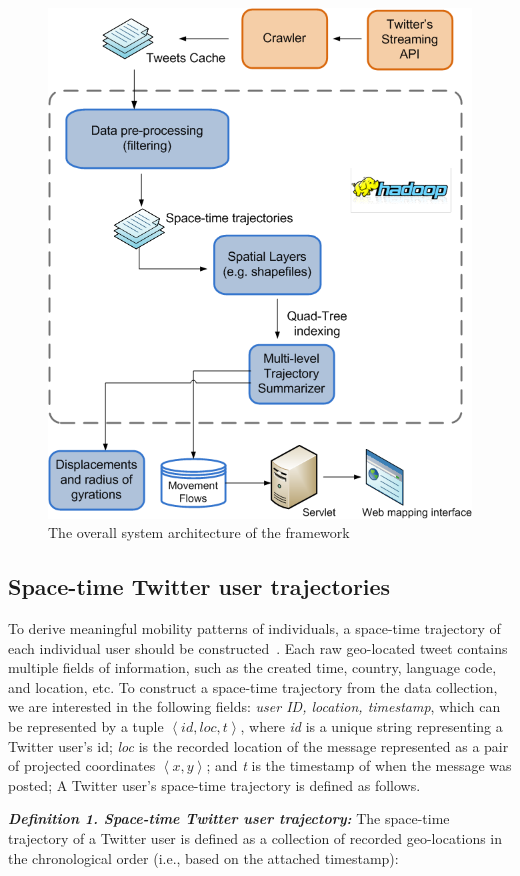 \documentclass[ijgi,article,accept,moreauthors,pdftex,10pt,a4paper]{mdpi}
\theoremstyle{mdpi}
\newcounter{ex}
\newcounter{re}
\theoremstyle{mdpidefinition}
\begin{document}
\begin{figure}[ht]
\centering
\includegraphics[width=0.55\linewidth]{./figures/Overall_Architecture222}
\caption{The overall system architecture of the framework}
\label{fig:overall_archi}
\end{figure}
\FloatBarrier

\subsection{Space-time Twitter user trajectories}
To derive meaningful mobility patterns of individuals, a space-time trajectory of each individual user should be constructed~\cite{hagerstrand1985time}.
Each raw geo-located tweet contains multiple fields of information, such as the created time, country, language code, and location, etc.
To construct a space-time trajectory from the data collection, we are interested in the following fields: \textit{user ID, location, timestamp}, which can be represented by a tuple $\left\langle id, loc, t\right\rangle$, where \textit{id} is a unique string representing a Twitter user's id; \textit{loc} is the recorded location of the message represented as a pair of projected coordinates $\left\langle x, y\right\rangle$;
and \textit{t} is the timestamp of when the message was posted; A Twitter user's space-time trajectory is defined as follows.
\newline

\noindent\emph{\textbf{Definition 1. Space-time Twitter user trajectory:}} The space-time trajectory of a Twitter user is defined as a collection of recorded geo-locations in the chronological order (i.e., based on the attached timestamp):
\newline
\end{document}
